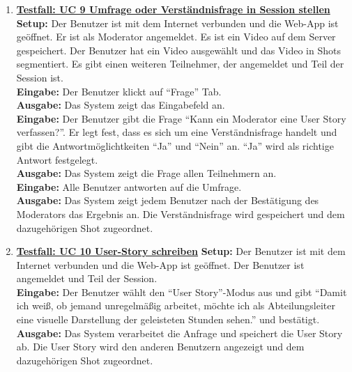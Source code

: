 \begin{enumerate}
	\item \underline{\textbf{Testfall: UC 9 Umfrage oder Verständnisfrage in Session stellen}} \linebreak
	\textbf{Setup:} Der Benutzer ist mit dem Internet verbunden und die Web-App ist geöffnet. Er ist als Moderator angemeldet. Es ist ein Video auf dem Server gespeichert. Der Benutzer hat ein Video ausgewählt und das Video in Shots segmentiert. Es gibt einen weiteren Teilnehmer, der angemeldet und Teil der Session ist.\\
	\textbf{Eingabe:} Der Benutzer klickt auf ``Frage'' Tab. \\
	\textbf{Ausgabe:} Das System zeigt das Eingabefeld an.\\ 
	\textbf{Eingabe:} Der Benutzer gibt die Frage ``Kann ein Moderator eine User Story verfassen?''. Er legt fest, dass es sich um eine Verständnisfrage handelt und gibt die Antwortmöglichtkeiten ``Ja'' und ``Nein'' an. ``Ja'' wird als richtige Antwort festgelegt.\\
	\textbf{Ausgabe:} Das System zeigt die Frage allen Teilnehmern an.\\ 
	\textbf{Eingabe:} Alle Benutzer antworten auf die Umfrage. \\
	\textbf{Ausgabe:} Das System zeigt jedem Benutzer nach der Bestätigung des Moderators das Ergebnis an. Die Verständnisfrage wird gespeichert und dem dazugehörigen Shot zugeordnet. \\
	
	\item \underline{\textbf{Testfall: UC 10 User-Story schreiben}} \linebreak
	\textbf{Setup:} Der Benutzer ist mit dem Internet verbunden und die Web-App ist geöffnet. Der Benutzer ist angemeldet und Teil der Session.\\
	\textbf{Eingabe:} Der Benutzer wählt den ``User Story''-Modus aus und gibt ``Damit ich weiß, ob jemand unregelmäßig arbeitet, möchte ich als Abteilungsleiter eine visuelle Darstellung der geleisteten Stunden sehen.'' und bestätigt.\\
	\textbf{Ausgabe:} Das System verarbeitet die Anfrage und speichert die User Story ab. Die User Story wird den anderen Benutzern angezeigt und dem dazugehörigen Shot zugeordnet.\linebreak \linebreak
	

\end{enumerate}
